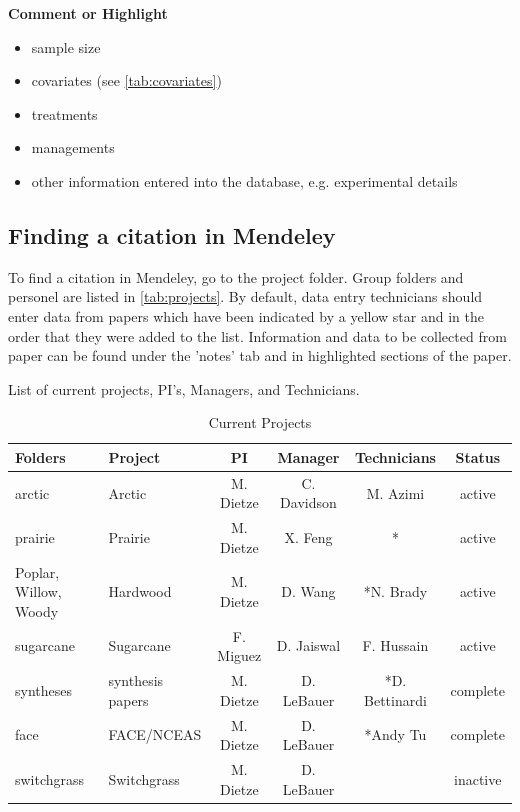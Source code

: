 \documentclass[12pt,english,portrait]{article}
\begin{document}
\vspace{1em}
\noindent\textbf{Comment or Highlight}

\begin{itemize}
\item sample size
\item covariates (see \autoref{tab:covariates})
\item treatments
\item managements
\item other information entered into the database, e.g. experimental details
\end{itemize}

\subsection{Finding a citation in Mendeley}
 To find a citation in Mendeley, go to the project folder. 
Group folders and personel are listed in \autoref{tab:projects}. 
 By default, data entry technicians should enter data from papers which have been indicated by a yellow star and in the order that they were added to the list.
  Information and data to be collected from  paper can be found under the 'notes' tab and in highlighted sections of the paper. 

\begin{table}[bh]
  \caption{Current Projects}{List of current projects, PI's, Managers, and Technicians.}
  \label{tab:projects}
  \begin{tabularx}{\textwidth}{p{1in}lcccc}
    \hline 
    Folders & Project & PI & Manager & Technicians & Status\\
    \hline
    arctic & Arctic & M. Dietze & C. Davidson & M. Azimi& active\\
    prairie & Prairie & M. Dietze & X. Feng & {*}& active\\
    Poplar, Willow, Woody & Hardwood & M. Dietze & D. Wang & {*}N. Brady& active\\
    sugarcane & Sugarcane & F. Miguez & D. Jaiswal & F. Hussain& active\\
    syntheses&  synthesis papers& M. Dietze & D. LeBauer & {*}D. Bettinardi& complete\\
    face & FACE/NCEAS & M. Dietze & D. LeBauer & {*}Andy Tu& complete\\
    switchgrass & Switchgrass & M. Dietze & D. LeBauer & & inactive\\
    \hline
  \end{tabularx}
\end{table}
\end{document}
